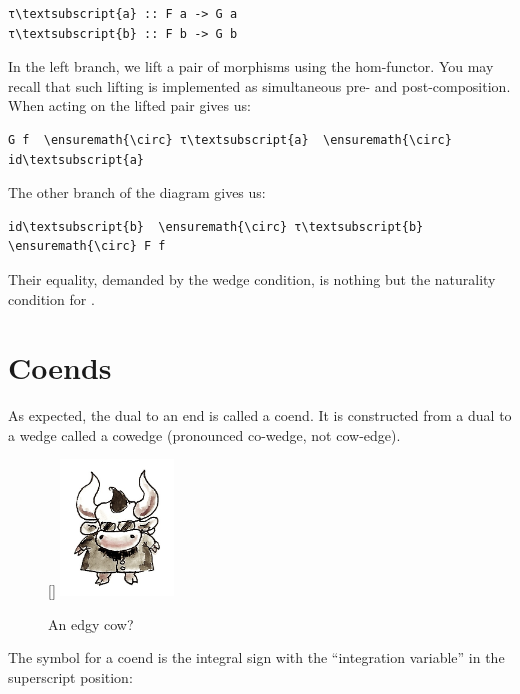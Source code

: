 \begin{Verbatim}[commandchars=\\\{\}]
τ\textsubscript{a} :: F a -> G a
τ\textsubscript{b} :: F b -> G b
\end{Verbatim}
In the left branch, we lift a pair of morphisms
 using the hom-functor. You
may recall that such lifting is implemented as simultaneous pre- and
post-composition. When acting on  the lifted pair gives us:

\begin{Verbatim}[commandchars=\\\{\}]
G f  \ensuremath{\circ} τ\textsubscript{a}  \ensuremath{\circ} id\textsubscript{a}
\end{Verbatim}
The other branch of the diagram gives us:

\begin{Verbatim}[commandchars=\\\{\}]
id\textsubscript{b}  \ensuremath{\circ} τ\textsubscript{b}  \ensuremath{\circ} F f
\end{Verbatim}
Their equality, demanded by the wedge condition, is nothing but the
naturality condition for .

\section{Coends}\label{coends}
As expected, the dual to an end is called a coend. It is constructed
from a dual to a wedge called a cowedge (pronounced co-wedge, not
cow-edge).

\begin{figure}
\raisebox{0pt}[\dimexpr{}\baselineskip\relax]{
\includegraphics[width=30mm]{images/end-31.jpg}}%
\caption{An edgy cow?}
\end{figure}

The symbol for a coend is the integral sign with the ``integration
variable'' in the superscript position:

